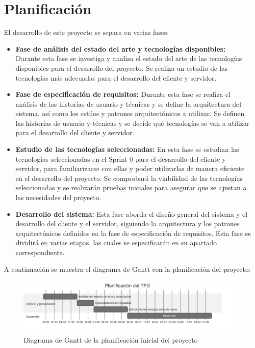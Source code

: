\section{Planificación}
El desarrollo de este proyecto se separa en varias fases:
\begin{itemize}
    \item \textbf{Fase de análisis del estado del arte y tecnologías disponibles:} Durante esta fase se investiga y analiza el estado del arte de las tecnologías disponibles para el desarrollo del proyecto. Se realiza un estudio de las tecnologías más adecuadas para el desarrollo del cliente y servidor.
    \item \textbf{Fase de especificación de requisitos:} Durante esta fase se realiza el análisis de las historias de usuario y técnicas y se define la arquitectura del sistema, así como los estilos y patrones arquitectónicos a utilizar. Se definen las historias de usuario y técnicas y se decide qué tecnologías se van a utilizar para el desarrollo del cliente y servidor.
    \item \textbf{Estudio de las tecnologías seleccionadas:} En esta fase se estudian las tecnologías seleccionadas en el Sprint 0 para el desarrollo del cliente y servidor, para familiarizarse con ellas y poder utilizarlas de manera eficiente en el desarrollo del proyecto. Se comprobará la viabilidad de las tecnologías seleccionadas y se realizarán pruebas iniciales para asegurar que se ajustan a las necesidades del proyecto.
    \item \textbf{Desarrollo del sistema:} Esta fase aborda el diseño general del sistema y el desarrollo del cliente y el servidor, siguiendo la arquitectura y los patrones arquitectónicos definidos en la fase de especificación de requisitos. Esta fase se dividirá en varias etapas, las cuales se especificarán en su apartado correspondiente.
\end{itemize}

A continuación se muestra el diagrama de Gantt con la planificación del proyecto:
\begin{figure}[H]
    \begin{center}
        \includegraphics[width=\textwidth]{assets/planificacion-inicial.png}
    \end{center}
    \caption{Diagrama de Gantt de la planificación inicial del proyecto}\label{fig:planificacion-inicial}
\end{figure}


